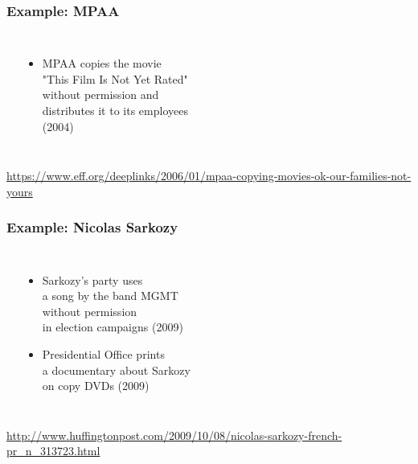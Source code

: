 \documentclass[dvipsnames]{beamer}
\theoremstyle{plain}
\begin{document}
\begin{frame}
  \frametitle{Example: MPAA}

  \begin{columns}
    \begin{center}
    \end{center}

    \begin{itemize}
      \item MPAA copies the movie\\
        "This Film Is Not Yet Rated"\\
        without permission and\\
        distributes it to its employees\\
        (2004)
    \end{itemize}
  \end{columns}

  \medskip
  \tiny{\url{https://www.eff.org/deeplinks/2006/01/mpaa-copying-movies-ok-our-families-not-yours}}\\
\end{frame}

\begin{frame}
  \frametitle{Example: Nicolas Sarkozy}

  \begin{columns}
    \begin{center}
    \end{center}

    \begin{itemize}
      \item Sarkozy's party uses\\
        a song by the band MGMT\\
        without permission\\
        in election campaigns (2009)
      \item Presidential Office prints\\
        a documentary about Sarkozy\\
        on copy DVDs (2009)
    \end{itemize}
  \end{columns}

  \medskip
  \tiny{\url{http://www.huffingtonpost.com/2009/10/08/nicolas-sarkozy-french-pr_n_313723.html}}\\
\end{frame}
\end{document}
